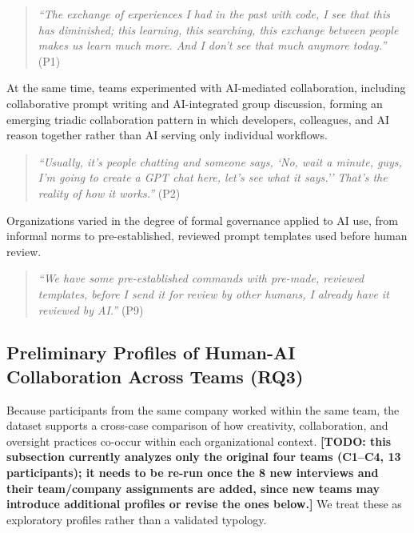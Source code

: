 \documentclass[10pt,journal,compsoc]{IEEEtran}
\begin{document}
\begin{quote}
\textit{``The exchange of experiences I had in the past with code, I see that this has diminished; this learning, this searching, this exchange between people makes us learn much more. And I don't see that much anymore today.''} (P1)
\end{quote}

At the same time, teams experimented with AI-mediated collaboration, including collaborative prompt writing and AI-integrated group discussion, forming an emerging triadic collaboration pattern in which developers, colleagues, and AI reason together rather than AI serving only individual workflows.

\begin{quote}
\textit{``Usually, it's people chatting and someone says, `No, wait a minute, guys, I'm going to create a GPT chat here, let's see what it says.'\thinspace' That's the reality of how it works.''} (P2)
\end{quote}

Organizations varied in the degree of formal governance applied to AI use, from informal norms to pre-established, reviewed prompt templates used before human review.

\begin{quote}
\textit{``We have some pre-established commands with pre-made, reviewed templates, before I send it for review by other humans, I already have it reviewed by AI.''} (P9)
\end{quote}

\subsection{Preliminary Profiles of Human-AI Collaboration Across Teams (RQ3)}
\label{sec:rq3}

Because participants from the same company worked within the same team, the dataset supports a cross-case comparison of how creativity, collaboration, and oversight practices co-occur within each organizational context. \textbf{[TODO: this subsection currently analyzes only the original four teams (C1--C4, 13 participants); it needs to be re-run once the 8 new interviews and their team/company assignments are added, since new teams may introduce additional profiles or revise the ones below.]} We treat these as exploratory profiles rather than a validated typology.
\end{document}
